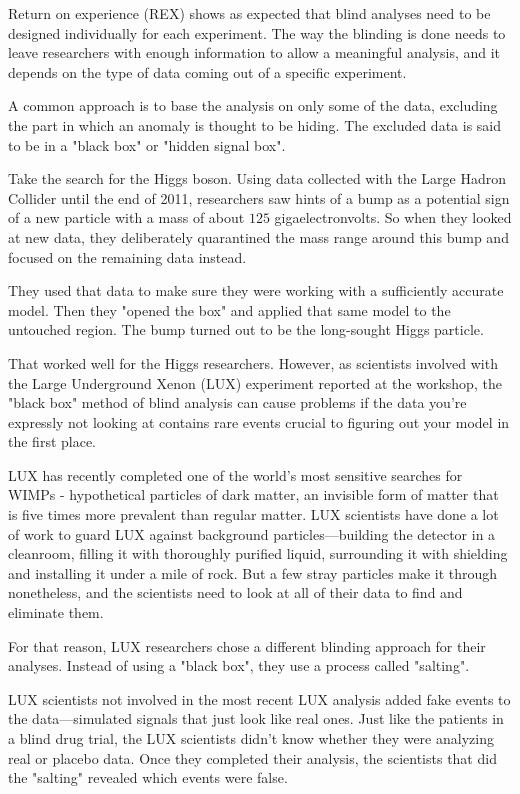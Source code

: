 	Return on experience (REX) shows as expected that blind analyses need to be designed individually for each experiment. The way the blinding is done needs to leave researchers with enough information to allow a meaningful analysis, and it depends on the type of data coming out of a specific experiment.

	A common approach is to base the analysis on only some of the data, excluding the part in which an anomaly is thought to be hiding. The excluded data is said to be in a "black box" or "hidden signal box".

	Take the search for the Higgs boson. Using data collected with the Large Hadron Collider until the end of 2011, researchers saw hints of a bump as a potential sign of a new particle with a mass of about $125$ gigaelectronvolts. So when they looked at new data, they deliberately quarantined the mass range around this bump and focused on the remaining data instead.

	They used that data to make sure they were working with a sufficiently accurate model. Then they "opened the box" and applied that same model to the untouched region. The bump turned out to be the long-sought Higgs particle.

	That worked well for the Higgs researchers. However, as scientists involved with the Large Underground Xenon (LUX) experiment reported at the workshop, the "black box" method of blind analysis can cause problems if the data you're expressly not looking at contains rare events crucial to figuring out your model in the first place.
	
	LUX has recently completed one of the world’s most sensitive searches for WIMPs - hypothetical particles of dark matter, an invisible form of matter that is five times more prevalent than regular matter. LUX scientists have done a lot of work to guard LUX against background particles—building the detector in a cleanroom, filling it with thoroughly purified liquid, surrounding it with shielding and installing it under a mile of rock. But a few stray particles make it through nonetheless, and the scientists need to look at all of their data to find and eliminate them.

	For that reason, LUX researchers chose a different blinding approach for their analyses. Instead of using a "black box", they use a process called "salting".

	LUX scientists not involved in the most recent LUX analysis added fake events to the data—simulated signals that just look like real ones. Just like the patients in a blind drug trial, the LUX scientists didn't know whether they were analyzing real or placebo data. Once they completed their analysis, the scientists that did the "salting" revealed which events were false.

